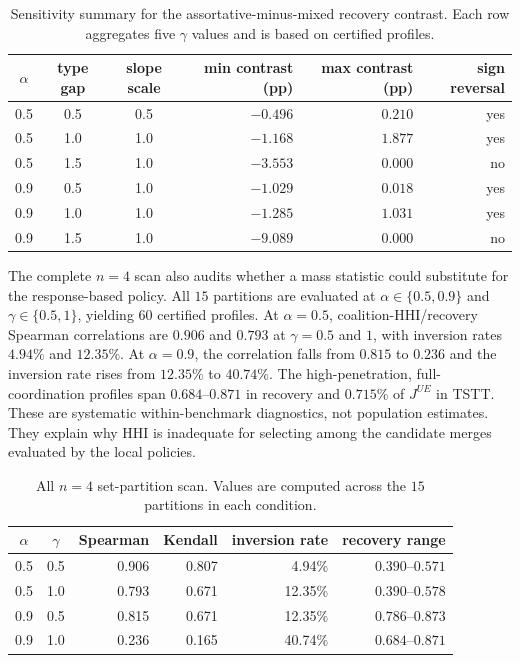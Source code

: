 \begin{table}[!htbp]
\centering
\small
\caption{Sensitivity summary for the assortative-minus-mixed recovery contrast. Each row aggregates five $\gamma$ values and is based on certified profiles.}
\label{tab:sensitivity-summary}
\begin{tabular}{cccrrr}
\toprule
$\alpha$ & type gap & slope scale & min contrast (pp) & max contrast (pp) & sign reversal\\
\midrule
0.5 & 0.5 & 0.5 & $-0.496$ & $0.210$ & yes\\
0.5 & 1.0 & 1.0 & $-1.168$ & $1.877$ & yes\\
0.5 & 1.5 & 1.0 & $-3.553$ & $0.000$ & no\\
0.9 & 0.5 & 1.0 & $-1.029$ & $0.018$ & yes\\
0.9 & 1.0 & 1.0 & $-1.285$ & $1.031$ & yes\\
0.9 & 1.5 & 1.0 & $-9.089$ & $0.000$ & no\\
\bottomrule
\end{tabular}
\end{table}

The complete $n=4$ scan also audits whether a mass statistic could substitute
for the response-based policy. All $15$ partitions are evaluated at
$\alpha\in\{0.5,0.9\}$ and $\gamma\in\{0.5,1\}$, yielding $60$ certified
profiles. At $\alpha=0.5$, coalition-HHI/recovery Spearman correlations are
$0.906$ and $0.793$ at $\gamma=0.5$ and $1$, with inversion rates $4.94\%$ and
$12.35\%$. At $\alpha=0.9$, the correlation falls from $0.815$ to $0.236$ and
the inversion rate rises from $12.35\%$ to $40.74\%$. The high-penetration,
full-coordination profiles span $0.684$--$0.871$ in recovery and $0.715\%$ of
$J^{UE}$ in TSTT. These are systematic within-benchmark diagnostics, not
population estimates. They explain why HHI is inadequate for selecting among
the candidate merges evaluated by the local policies.

\begin{table}[!htbp]
\centering
\small
\caption{All $n=4$ set-partition scan. Values are computed across the $15$ partitions in each condition.}
\label{tab:partition-scan}
\begin{tabular}{ccrrrr}
\toprule
$\alpha$ & $\gamma$ & Spearman & Kendall & inversion rate & recovery range\\
\midrule
0.5 & 0.5 & 0.906 & 0.807 & 4.94\% & $0.390$--$0.571$\\
0.5 & 1.0 & 0.793 & 0.671 & 12.35\% & $0.390$--$0.578$\\
0.9 & 0.5 & 0.815 & 0.671 & 12.35\% & $0.786$--$0.873$\\
0.9 & 1.0 & 0.236 & 0.165 & 40.74\% & $0.684$--$0.871$\\
\bottomrule
\end{tabular}
\end{table}

